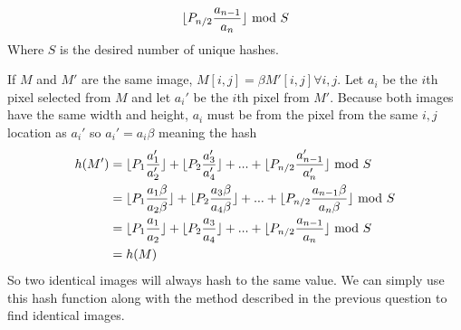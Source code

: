 \documentclass[11pt]{article}
\DeclarePairedDelimiter\floor{\lfloor}{\rfloor}
\begin{document}
\begin{enumerate}
\begin{enumerate}
$$			\floor{P_{n/2}\frac{a_{n-1}}{a_n}} \text{ mod } S $$
			Where $S$ is the desired number of unique hashes. 
		\end{enumerate}
			If $M$ and $M'$ are the same image, $M[i,j] = \beta
			M'[i,j] \forall i,j$. Let $a_i$ be the $i$th pixel selected from
			$M$ and let $a_i'$ be the $i$th pixel from $M'$. Because both
			images have the same width and height, $a_i$ must be from
			the pixel from the same $i,j$ location as $a_i'$ so
			$a_i'  = a_i\beta$ meaning the hash
			\begin{align*}
				h(M') & =  \floor{P_1\frac{a_1'}{a_2'}} +
			\floor{P_2\frac{a_3'}{a_4'}} + ...+
			\floor{P_{n/2}\frac{a_{n-1}'}{a_n'}} \text{ mod } S\\ 
				& =  \floor{P_1\frac{a_1\beta}{a_2\beta}} +
			\floor{P_2\frac{a_3\beta}{a_4\beta}} + ...+
			\floor{P_{n/2}\frac{a_{n-1}\beta}{a_n\beta}} \text{ mod } S\\ 
				& =  \floor{P_1\frac{a_1}{a_2}} +
			\floor{P_2\frac{a_3}{a_4}} + ...+
			\floor{P_{n/2}\frac{a_{n-1}}{a_n}} \text{ mod } S\\ 
				& = h(M)
			\end{align*}
			So two identical images will always hash to the same
			value. We can simply use this hash function along with
			the method described in the previous question to
			find identical images.
\end{enumerate}
\end{document}
